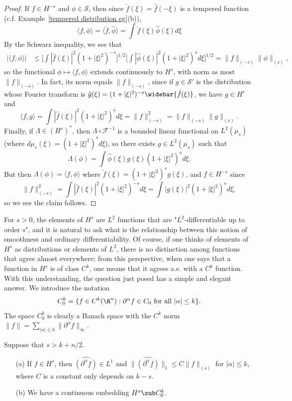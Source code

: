\begin{proof}
If $f\in H^{-s}$ and $\phi\in\mathscr{S}$, then since $\check{f}(\xi)=\hat{f}(-\xi)$ is a tempered function (c.f. Example~\ref{tempered distribution eg}(b)),
\[\langle f,\phi\rangle=\langle\check{f},\hat{\phi}\rangle=\int\check{f}(\xi)\hat{\phi}(\xi)d\xi\]
By the Schwarz inequality, we see that
\begin{align*}
|\langle f,\phi\rangle|&\leq\Big[\int|\hat{f}(\xi)|^2(1+|\xi|^2)^{-s}\Big]^{1/2}\Big[\int|\hat{\phi}(\xi)|^2(1+|\xi|^2)^sd\xi\Big]^{1/2}=\|f\|_{(-s)}\|\phi\|_{(s)},
\end{align*}
so the functional $\phi\mapsto\langle f,\phi\rangle$ extends continuously to $H^s$, with norm as most $\|f\|_{(-s)}$. In fact, its norm equals $\|f\|_{(-s)}$, since if $g\in\mathscr{S}'$ is the distribution whose Fourier transform is $\hat{g}(\xi)=(1+|\xi|^2)^{-s}\widebar{\hat{f}(\xi)}$, we have $g\in H^s$ and
\[\langle f,g\rangle=\int|\hat{f}(\xi)|^2(1+|\xi|^2)^sd\xi=\|f\|_{(-s)}^2=\|f\|_{(-s)}\|g\|_{(s)}.\]
Finally, if $\Lambda\in (H^s)^*$, then $\Lambda\circ\mathscr{F}^{-1}$ is a bounded linear functional on $L^2(\mu_s)$ (where $d\mu_s(\xi)=(1+|\xi|^2)^sd\xi$), so there exists $g\in L^2(\mu_s)$ such that
\[\Lambda(\phi)=\int\hat{\phi}(\xi)g(\xi)(1+|\xi|^2)^sd\xi.\]
But then $\Lambda(\phi)=\langle f,\phi\rangle$ where $\check{f}(\xi)=(1+|\xi|^2)^sg(\xi)$, and $f\in H^{-s}$ since
\[\|f\|_{(-s)}^2=\int|\hat{f}(\xi)|^2(1+|\xi|^2)^{-s}d\xi=\int|g(\xi)|^2(1+|\xi|^2)^sd\xi,\]
so we see the claim follows.
\end{proof}
For $s>0$, the elements of $H^s$ are $L^2$ functions that are "$L^2$-differentiable up to order $s$", and it is natural to ask what is the relationship between this notion of smoothness and ordinary differentiability. Of course, if one thinks of elements of $H^s$ as distributions or elements of $L^2$, there is no distinction among functions that agree almost everywhere; from this perspective, when one says that a function in $H^s$ is of class $C^k$, one means that it agrees a.e. with a $C^k$ function. With this understanding, the question just posed has a simple and elegant answer. We introduce the notation
\[C_0^k=\{f\in C^k(\R^n):\text{$\partial^\alpha f\in C_0$ for all $|\alpha|\leq k$}\}.\]
The space $C^k_0$ is clearly a Banach space with the $C^k$ norm $\|f\|=\sum_{|\alpha|\leq k}\|\partial^\alpha f\|_{\infty}$.
\begin{theorem}\label{Sobolev embedding thm}
Suppose that $s>k+n/2$.
\begin{itemize}
\item[(a)] If $f\in H^s$, then $\widehat{(\partial^\alpha f)}\in L^1$ and $\|\widehat{(\partial^\alpha f)}\|_1\leq C\|f\|_{(s)}$ for $|\alpha|\leq k$, where $C$ is a constant only depends on $k-s$.
\item[(b)] We have a continuous embedding $H^s\sub C_0^k$.
\end{itemize}
\end{theorem}
